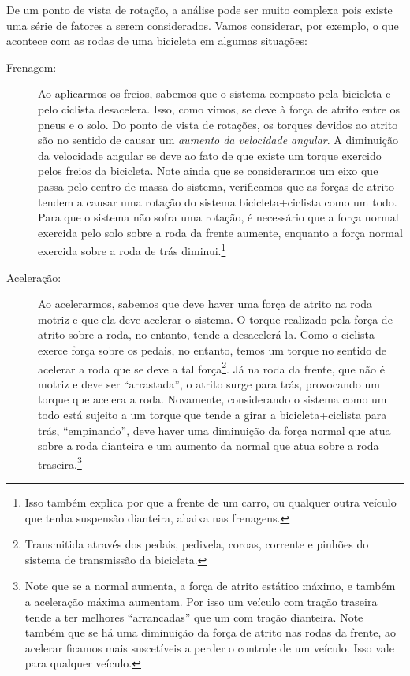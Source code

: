 De um ponto de vista de rotação, a análise pode ser muito complexa pois existe uma série de fatores a serem considerados. Vamos considerar, por exemplo, o que acontece com as rodas de uma bicicleta em algumas situações:
\begin{description}
    \item[Frenagem:] Ao aplicarmos os freios, sabemos que o sistema composto pela bicicleta e pelo ciclista desacelera. Isso, como vimos, se deve à força de atrito entre os pneus e o solo. Do ponto de vista de rotações, os torques devidos ao atrito são no sentido de causar um \emph{aumento da velocidade angular}. A diminuição da velocidade angular se deve ao fato de que existe um torque exercido pelos freios da bicicleta. Note ainda que se considerarmos um eixo que passa pelo centro de massa do sistema, verificamos que as forças de atrito tendem a causar uma rotação do sistema bicicleta+ciclista como um todo. Para que o sistema não sofra uma rotação, é necessário que a força normal exercida pelo solo sobre a roda da frente aumente, enquanto a força normal exercida sobre a roda de trás diminui.\footnote{Isso também explica por que a frente de um carro, ou qualquer outra veículo que tenha suspensão dianteira, abaixa nas frenagens.}
    \item[Aceleração:] Ao acelerarmos, sabemos que deve haver uma força de atrito na roda motriz e que ela deve acelerar o sistema. O torque realizado pela força de atrito sobre a roda, no entanto, tende a desacelerá-la. Como o ciclista exerce força sobre os pedais, no entanto, temos um torque no sentido de acelerar a roda que se deve a tal força\footnote{Transmitida através dos pedais, pedivela, coroas, corrente e pinhões do sistema de transmissão da bicicleta.}. Já na roda da frente, que não é motriz e deve ser ``arrastada'', o atrito surge para trás, provocando um torque que acelera a roda. Novamente, considerando o sistema como um todo está sujeito a um torque que tende a girar a bicicleta+ciclista para trás, ``empinando'', deve haver uma diminuição da força normal que atua sobre a roda dianteira e um aumento da normal que atua sobre a roda traseira.\footnote{Note que se a normal aumenta, a força de atrito estático máximo, e também a aceleração máxima aumentam. Por isso um veículo com tração traseira tende a ter melhores ``arrancadas'' que um com tração dianteira. Note também que se há uma diminuição da força de atrito nas rodas da frente, ao acelerar ficamos mais suscetíveis a perder o controle de um veículo. Isso vale para qualquer veículo.}

\end{description}
